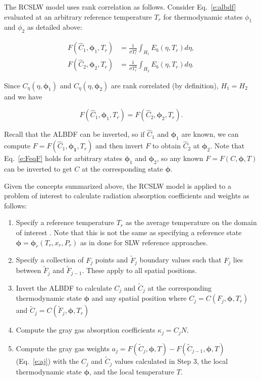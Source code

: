 \documentclass[preprint,12pt]{elsarticle}
\newcommand{\BS}{\boldsymbol}
\begin{document}
The RCSLW model uses rank correlation as follows.
Consider Eq.~\ref{e:albdf} evaluated at an arbitrary reference temperature $T_r$ for thermodynamic states $\phi_1$ and $\phi_2$ as detailed above:
%
\begin{linenomath}
\begin{align} \label{e:albdf2}
F(\hat{C}_1,\BS{\phi}_1,T_r) &= \frac{1}{\sigma T_r^4}\int_{H_1}E_b(\eta,T_r)d\eta, \\
F(\hat{C}_2,\BS{\phi}_2,T_r) &= \frac{1}{\sigma T_r^4}\int_{H_2}E_b(\eta,T_r)d\eta.
\end{align}
\end{linenomath}
%
Since $C_\eta(\eta,\BS{\phi}_1)$ and $C_\eta(\eta,\BS{\phi}_2)$ are rank correlated (by definition), $H_1=H_2$ and we have
%
\begin{linenomath}
\begin{equation} \label{e:FeqF}
F(\hat{C}_1,\BS{\phi}_1,T_r)=F(\hat{C}_2,\BS{\phi}_2,T_r).
\end{equation}
\end{linenomath}
%
Recall that the ALBDF can be inverted, so if $\hat{C}_1$ and $\BS{\phi}_1$ are known, we can compute $F=F(\hat{C}_1,\BS{\phi_1},T_r)$ and then invert $F$ to obtain $\hat{C}_2$ at $\BS{\phi}_2$. Note that Eq.~\ref{e:FeqF} holds for arbitrary states $\BS{\phi}_1$ and $\BS{\phi}_2$, so any known $F=F(C,\BS{\phi},T)$ can be inverted to get $C$ at the corresponding state $\BS{\phi}$.

Given the concepts summarized above, the RCSLW model is applied to a problem of interest to calculate radiation absorption coefficients and weights as follows:
%
\begin{enumerate}
    \item Specify a reference temperature $T_r$ as the average temperature on the domain of interest \cite{Solovjov_2001}. Note that this is not the same as specifying a reference state $\BS{\phi}=\BS{\phi}_r(T_r,x_r,P_r)$ as in done for SLW reference approaches. %
    \item Specify a collection of $F_j$ points and $\tilde{F}_j$ boundary values such that $F_j$ lies between $\tilde{F}_j$ and $\tilde{F}_{j-1}$. These apply to all spatial positions.
    \item Invert the ALBDF to calculate $C_j$ and $\tilde{C}_j$ at the corresponding thermodynamic state $\BS{\phi}$ and any spatial position where $C_j = C(F_j,\BS{\phi},T_r)$ and $\tilde{C}_j = C(\tilde{F}_j,\BS{\phi},T_r)$
    \item Compute the gray gas absorption coefficients $\kappa_j=C_jN$.
    \item Compute the gray gas weights $a_j=F(\tilde{C}_j,\BS{\phi}, T) - F(\tilde{C}_{j-1},\BS{\phi}, T)$ (Eq.~\ref{e:aj}) with the $C_j$ and $\tilde{C}_j$ values calculated in Step 3, the local thermodynamic state $\BS{\phi}$, and the local temperature $T$.
\end{enumerate}
\end{document}
